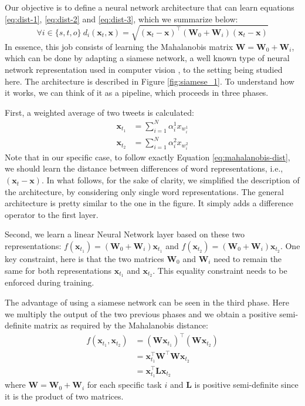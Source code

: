 \documentclass[letterpaper]{article}
\begin{document}
Our objective is to define a neural network architecture that can learn equations \ref{eq:dist-1}, \ref{eq:dist-2} and \ref{eq:dist-3}, which we summarize below: 
\begin{equation}
\forall i \in \{s, t, o\}\  d_i(\mathbf{x}_t, \mathbf{x}) = \sqrt{( \mathbf{x}_t - \mathbf{x})^\intercal(\mathbf{W}_0 + \mathbf{W}_i) ( \mathbf{x}_t - \mathbf{x})}\label{eq:mahalanobis-dist} 
\end{equation}
In essence, this job consists of learning the Mahalanobis matrix $\mathbf{W} = \mathbf{W}_0 + \mathbf{W}_i$, which can be done by adapting a siamese network, a well known type of neural network representation used in computer vision \cite{Chopra2005a, Zagoryuko2015}, to the setting being studied here. The architecture is described in Figure \ref{fig:siamese_1}.  To understand how it works, we can think of it as a pipeline, which proceeds in three phases.  

First, a weighted average of two tweets is calculated: 
\begin{align}
\mathbf{x}_{t_1} &= \sum^N_{i =1} \alpha^1_i x_{w^1_i}\\
\mathbf{x}_{t_2} &= \sum^N_{i =1} \alpha^2_i x_{w^2_i} 
\end{align}
Note that in our specific case, to follow exactly Equation \ref{eq:mahalanobis-dist}, we should learn the distance between differences of word representations, i.e., $(\mathbf{x}_t - \mathbf{x})$. In what follows, for the sake of clarity, we simplified the description of the architecture, by considering only single word representations. The general architecture is pretty similar to the one in the figure. It simply adds a difference operator to the first layer. 

Second, we learn a linear Neural Network layer based on these two representations: $f(\mathbf{x}_{t_1}) = (\mathbf{W}_0 + \mathbf{W}_i) \mathbf{x}_{t_1}$ and $f(\mathbf{x}_{t_2}) = (\mathbf{W}_0 + \mathbf{W}_i) \mathbf{x}_{t_2}$. One key constraint, here is that the two matrices  $\mathbf{W}_0$ and $\mathbf{W}_i$ need to remain the same for both representations $\mathbf{x}_{t_1}$ and $\mathbf{x}_{t_2}$. This equality constraint needs to be enforced during training. 

The advantage of using a siamese network can be seen in the third phase. Here we multiply the output of the two previous phases and we obtain a positive semi-definite matrix as required by the Mahalanobis distance: 
\begin{align}
f( \mathbf{x}_{t_1}, \mathbf{x}_{t_2} ) &= (\mathbf{W} \mathbf{x}_{t_1})^\intercal (\mathbf{W} \mathbf{x}_{t_2})\\
&= \mathbf{x}^{\intercal}_{t_1} \mathbf{W}^\intercal \mathbf{W} \mathbf{x}_{t_2}\\
&= \mathbf{x}^{\intercal}_{t_1} \mathbf{L} \mathbf{x}_{t_2}
\end{align} 
where $\mathbf{W} = \mathbf{W}_0 + \mathbf{W}_i$ for each specific task $i$ and $\mathbf{L}$ is positive semi-definite since it is the product of two matrices. 
\end{document}
